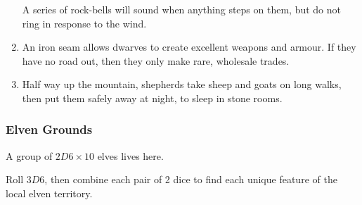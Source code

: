 \begin{multicols}{2}
\begin{enumerate}
  A series of rock-bells will sound when anything steps on them, but do not ring in response to the wind.
  \item
  An iron seam allows dwarves to create excellent weapons and armour.
  If they have no road out, then they only make rare, wholesale trades.
  \item
  Half way up the mountain, shepherds take sheep and goats on long walks, then put them safely away at night, to sleep in stone rooms.
\end{enumerate}

\subsubsection{Elven Grounds}
\label{elvesPoint}

A group of $2D6 \times 10$ elves lives here.

Roll $3D6$, then combine each pair of 2 dice to find each unique feature of the local elven territory.


\end{multicols}

